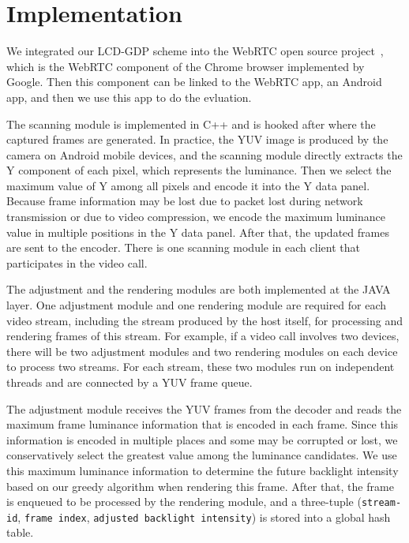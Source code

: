 \section{Implementation}
\label{sec:implementation}



We integrated our LCD-GDP scheme into the WebRTC open source
project~\cite{webrtcproject}, which is the WebRTC component of
the Chrome browser implemented by Google. Then this component can be
linked to the WebRTC app, an Android app, and then we use this app to
do the evluation. 

The scanning module is implemented in C++ and is hooked after where
the captured frames are generated.  In practice, the YUV image is
produced by the camera on Android mobile devices, and the scanning
module directly extracts the Y component of each pixel, which
represents the luminance. Then we select the maximum value of Y among
all pixels and encode it into the Y data panel.  Because frame
information may be lost due to packet lost during network transmission
or due to video compression, we encode the maximum luminance value in
multiple positions in the Y data panel.  After that, the updated
frames are sent to the encoder. There is one scanning module in each
client that participates in the video call.

The adjustment and the rendering modules are both implemented at the
JAVA layer.  One adjustment module and one rendering module are
required for each video stream, including the stream produced by the
host itself, for processing and rendering frames of this stream.  For
example, if a video call involves two devices, there will be two
adjustment modules and two rendering modules on each device to process
two streams.  For each stream, these two modules run on independent
threads and are connected by a YUV frame queue.

The adjustment module receives the YUV frames from the decoder and 
reads the maximum frame luminance information that is encoded in each frame.
Since this information is encoded in multiple places and some may be
corrupted or lost,
we conservatively select the greatest value among the luminance candidates.
We use this maximum luminance information to determine the future backlight intensity 
based on our greedy algorithm when rendering this frame.
After that, the frame is enqueued to be processed by the rendering module, 
and a three-tuple ({\tt stream-id}, {\tt frame index}, 
{\tt adjusted backlight intensity}) is stored into a global hash
table. 

